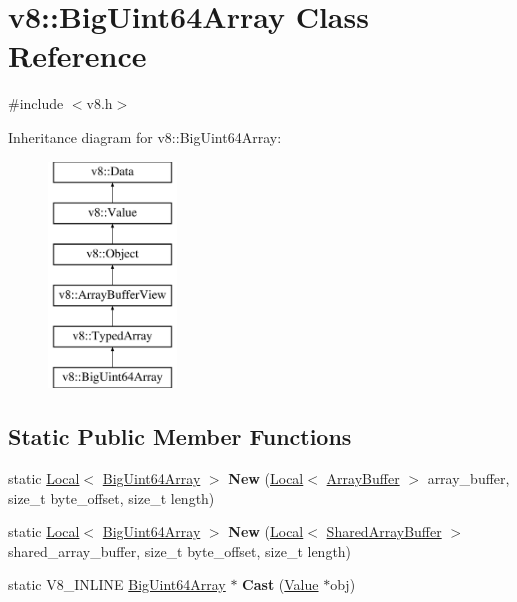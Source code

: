 \hypertarget{classv8_1_1BigUint64Array}{}\section{v8\+:\+:Big\+Uint64\+Array Class Reference}
\label{classv8_1_1BigUint64Array}


{\ttfamily \#include $<$v8.\+h$>$}

Inheritance diagram for v8\+:\+:Big\+Uint64\+Array\+:\begin{figure}[H]
\begin{center}
\leavevmode
\includegraphics[height=6.000000cm]{classv8_1_1BigUint64Array}
\end{center}
\end{figure}
\subsection*{Static Public Member Functions}
\begin{DoxyCompactItemize}
\item 
\mbox{\label{classv8_1_1BigUint64Array_a49486b6c122a92ff805500c7e3d804a2}} 
static \mbox{\hyperlink{classv8_1_1Local}{Local}}$<$ \mbox{\hyperlink{classv8_1_1BigUint64Array}{Big\+Uint64\+Array}} $>$ {\bfseries New} (\mbox{\hyperlink{classv8_1_1Local}{Local}}$<$ \mbox{\hyperlink{classv8_1_1ArrayBuffer}{Array\+Buffer}} $>$ array\+\_\+buffer, size\+\_\+t byte\+\_\+offset, size\+\_\+t length)
\item 
\mbox{\label{classv8_1_1BigUint64Array_af190afc53bd5e33ea828e288850a82b3}} 
static \mbox{\hyperlink{classv8_1_1Local}{Local}}$<$ \mbox{\hyperlink{classv8_1_1BigUint64Array}{Big\+Uint64\+Array}} $>$ {\bfseries New} (\mbox{\hyperlink{classv8_1_1Local}{Local}}$<$ \mbox{\hyperlink{classv8_1_1SharedArrayBuffer}{Shared\+Array\+Buffer}} $>$ shared\+\_\+array\+\_\+buffer, size\+\_\+t byte\+\_\+offset, size\+\_\+t length)
\item 
\mbox{\label{classv8_1_1BigUint64Array_abc27fcbc1198e9476b55a94165cea891}} 
static V8\+\_\+\+I\+N\+L\+I\+NE \mbox{\hyperlink{classv8_1_1BigUint64Array}{Big\+Uint64\+Array}} $\ast$ {\bfseries Cast} (\mbox{\hyperlink{classv8_1_1Value}{Value}} $\ast$obj)
\end{DoxyCompactItemize}
